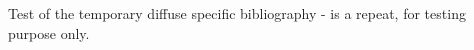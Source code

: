 \documentclass[aps,pre,preprint,groupedaddress,floatfix]{revtex4-1}
\begin{document}



Test of the temporary diffuse specific bibliography - 
is a repeat, for testing purpose only.


\PublicPrivate{}{%

      }%
\end{document}
